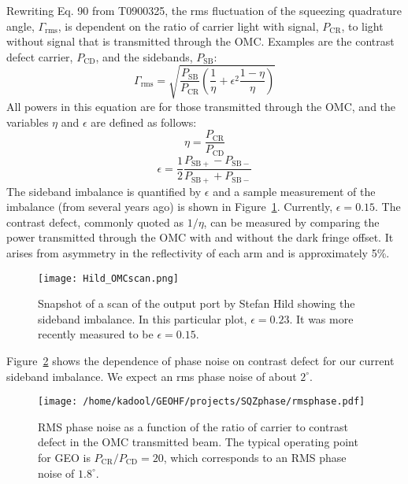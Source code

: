 \documentclass{ligodoc}
\begin{document}
Rewriting Eq. 90 from T0900325, the rms fluctuation of the squeezing
quadrature angle, $\Gamma_{\mathrm{rms}}$, is dependent on the ratio
of carrier light with signal, $P_{\mathrm{CR}}$, to light without
signal that is transmitted through the OMC. Examples are the contrast
defect carrier, $P_{\mathrm{CD}}$, and the sidebands, $P_{\mathrm{SB}}$:
\begin{equation}
\Gamma_{\mathrm{rms}} = \sqrt{\frac{P_{\mathrm{SB}}}{P_{\mathrm{CR}}} \left( \frac{1}{\eta} + \epsilon^2 \frac{1-\eta}{\eta} \right)}
\label{eq:Gammarms}
\end{equation}
All powers in this equation are for those transmitted through the OMC,
and the variables $\eta$ and $\epsilon$ are defined as follows:
\begin{equation}
\eta = \frac{P_{\mathrm{CR}}}{P_{\mathrm{CD}}}
\end{equation}
\begin{equation}
\epsilon = \frac{1}{2}\frac{P_{\mathrm{SB+}}-P_{\mathrm{SB-}}}{P_{\mathrm{SB+}}+P_{\mathrm{SB-}}}
\end{equation}
The sideband imbalance is quantified by $\epsilon$ and a sample
measurement of the imbalance (from several years ago) is shown in
Figure~\ref{fig:Hildscan}. Currently, $\epsilon=0.15$. The contrast
defect, commonly quoted as $1/\eta$, can be measured by comparing the
power transmitted through the OMC with and without the dark fringe
offset. It arises from asymmetry in the reflectivity of each arm and
is approximately 5\%.

\begin{figure}
\begin{centering}
\texttt{[image: Hild\_OMCscan.png]}
\caption{Snapshot of a scan of the output port by Stefan Hild showing
  the sideband imbalance. In this particular plot, $\epsilon=0.23$. It
  was more recently measured to be $\epsilon = 0.15$.}
\label{fig:Hildscan}
\end{centering}
\end{figure}

Figure~\ref{fig:phirms} shows the dependence of phase noise on
contrast defect for our current sideband imbalance. We expect an rms
phase noise of about $2^\circ$.

\begin{figure}
\begin{centering}
\texttt{[image: /home/kadool/GEOHF/projects/SQZphase/rmsphase.pdf]}
\caption{RMS phase noise as a function of the ratio of carrier to
  contrast defect in the OMC transmitted beam. The typical operating
  point for GEO is $P_{\mathrm{CR}}/P_{\mathrm{CD}}=20$, which
  corresponds to an RMS phase noise of $1.8^\circ$.}
\label{fig:phirms}
\end{centering}
\end{figure}
\end{document}

